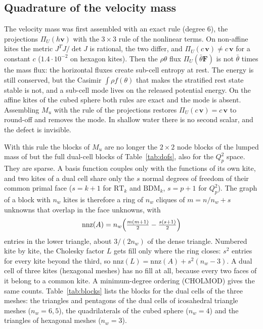 \documentclass[preprint,12pt]{elsarticle}
\newcommand{\bv}{\mathbf{v}}
\newcommand{\bF}{\mathbf{F}}
\theoremstyle{definition}
\begin{document}
\subsection{Quadrature of the velocity mass}\label{sec:quadrature-mismatch}
The velocity mass was first assembled with an exact rule (degree 6), the projections $\Pi_U(h\bv)$ with the
$3\times3$ rule of the nonlinear terms. On non-affine kites the metric $J^TJ/\det J$ is rational, the two
differ, and $\Pi_U(c\,\bv)\ne c\,\bv$ for a constant $c$ ($1.4\cdot10^{-2}$ on hexagon kites). Then the
$\rho\theta$ flux $\Pi_U(\bar\theta\bF)$ is not $\bar\theta$ times the mass flux: the horizontal fluxes create
sub-cell entropy at rest. The energy is still conserved, but the Casimir $\int\rho f(\theta)$ that makes the
stratified rest state stable is not, and a sub-cell mode lives on the released potential energy. On the
affine kites of the cubed sphere both rules are exact and the mode is absent. Assembling $M_u$ with the rule
of the projections restores $\Pi_U(c\,\bv) = c\,\bv$ to round-off and removes the mode. In shallow water there
is no second scalar, and the defect is invisible.

With this rule the blocks of $M_u$ are no longer the $2\times2$ node blocks of the lumped mass of
\cite{Wess2024} but the full dual-cell blocks of Table~\ref{tab:dofs}, also for the $Q_p^2$ space. They are
sparse. A basis function couples only with the functions of its own kite, and two kites of a dual cell share
only the $s$ normal degrees of freedom of their common primal face ($s = k+1$ for $\mathrm{RT}_k$ and
$\mathrm{BDM}_k$, $s = p+1$ for $Q_p^2$). The graph of a block with $n_w$ kites is therefore a ring of $n_w$
cliques of $m = n/n_w + s$ unknowns that overlap in the face unknowns, with
\[
  \mathrm{nnz}(A) = n_w\Bigl(\tfrac{m(m+1)}{2} - \tfrac{s(s+1)}{2}\Bigr)
\]
entries in the lower triangle, about $3/(2n_w)$ of the dense triangle. Numbered kite by kite, the Cholesky
factor $L$ gets fill only where the ring closes: $s^2$ entries for every kite beyond the third, so
$\mathrm{nnz}(L) = \mathrm{nnz}(A) + s^2(n_w - 3)$. A dual cell of three kites (hexagonal meshes) has no fill at
all, because every two faces of it belong to a common kite. A minimum-degree ordering (CHOLMOD) gives the same
counts. Table~\ref{tab:blocks} lists the blocks for the dual cells of the three meshes: the triangles and
pentagons of the dual cells of icosahedral triangle meshes ($n_w = 6, 5$), the quadrilaterals of the cubed
sphere ($n_w = 4$) and the triangles of hexagonal meshes ($n_w = 3$).
\end{document}
